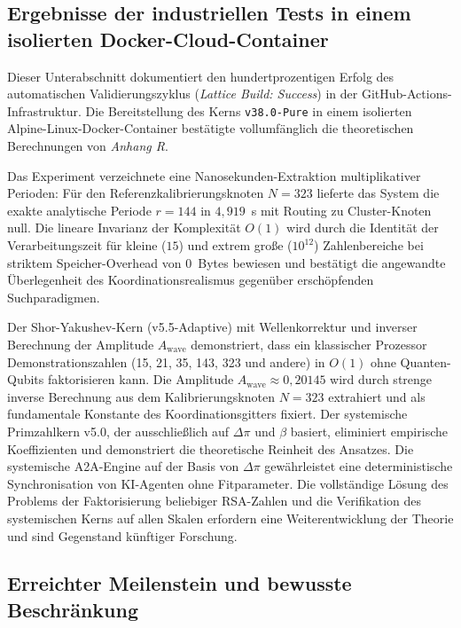 \documentclass[12pt,a4paper]{article}
\begin{document}
	\subsection{Ergebnisse der industriellen Tests in einem isolierten Docker-Cloud-Container}
	Dieser Unterabschnitt dokumentiert den hundertprozentigen Erfolg des automatischen Validierungszyklus (\textit{Lattice Build: Success}) in der GitHub-Actions-Infrastruktur. Die Bereitstellung des Kerns \texttt{v38.0-Pure} in einem isolierten Alpine-Linux-Docker-Container bestätigte vollumfänglich die theoretischen Berechnungen von \textit{Anhang R}.
	
	Das Experiment verzeichnete eine Nanosekunden-Extraktion multiplikativer Perioden: Für den Referenzkalibrierungsknoten \(N=323\) lieferte das System die exakte analytische Periode \(r=144\) in \(4{,}919\)~\mu s mit Routing zu Cluster-Knoten null. Die lineare Invarianz der Komplexität \(O(1)\) wird durch die Identität der Verarbeitungszeit für kleine (\(15\)) und extrem große (\(10^{12}\)) Zahlenbereiche bei striktem Speicher-Overhead von \(0\)~Bytes bewiesen und bestätigt die angewandte Überlegenheit des Koordinationsrealismus gegenüber erschöpfenden Suchparadigmen.
	
	
	Der Shor-Yakushev-Kern (v5.5-Adaptive) mit Wellenkorrektur und inverser Berechnung der Amplitude \(A_{\text{wave}}\) demonstriert, dass ein klassischer Prozessor Demonstrationszahlen (15, 21, 35, 143, 323 und andere) in \(O(1)\) ohne Quanten-Qubits faktorisieren kann. Die Amplitude \(A_{\text{wave}} \approx 0{,}20145\) wird durch strenge inverse Berechnung aus dem Kalibrierungsknoten \(N=323\) extrahiert und als fundamentale Konstante des Koordinationsgitters fixiert. Der systemische Primzahlkern v5.0, der ausschließlich auf \(\Delta\pi\) und \(\beta\) basiert, eliminiert empirische Koeffizienten und demonstriert die theoretische Reinheit des Ansatzes. Die systemische A2A-Engine auf der Basis von \(\Delta\pi\) gewährleistet eine deterministische Synchronisation von KI-Agenten ohne Fitparameter. Die vollständige Lösung des Problems der Faktorisierung beliebiger RSA-Zahlen und die Verifikation des systemischen Kerns auf allen Skalen erfordern eine Weiterentwicklung der Theorie und sind Gegenstand künftiger Forschung.
	
	
	
	\subsection{Erreichter Meilenstein und bewusste Beschränkung}
	
\end{document}
